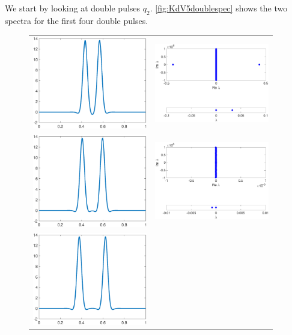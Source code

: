 \documentclass[thesis2.tex]{subfiles}
\begin{document}
We start by looking at double pulses $q_2$. \cref{fig:KdV5doublespec} shows the two spectra for the first four double pulses.
\begin{figure}
\begin{center}
\begin{tabular}{cc}
\includegraphics[width=5cm]{images/kdv5numerics/double1} &
\includegraphics[width=5cm]{images/kdv5numerics/double1spec} \\
\includegraphics[width=5cm]{images/kdv5numerics/double2} &
\includegraphics[width=5cm]{images/kdv5numerics/double2spec} \\
\includegraphics[width=5cm]{images/kdv5numerics/double3} &

\end{tabular}
\end{center}
\end{figure}
\end{document}
